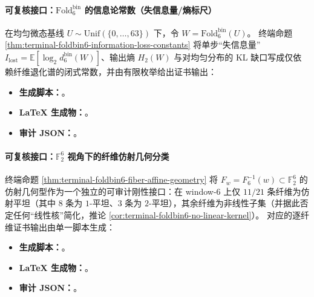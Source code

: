 \paragraph{可复核接口：\texorpdfstring{$\mathrm{Fold}^{\mathrm{bin}}_6$}{Foldbin6} 的信息论常数（失信息量/熵标尺）}
在均匀微态基线 \(U\sim\mathrm{Unif}(\{0,\dots,63\})\) 下，令 \(W=\mathrm{Fold}^{\mathrm{bin}}_6(U)\)。
终端命题 \ref{thm:terminal-foldbin6-information-loss-constants} 将单步“失信息量” \(I_{\mathrm{lost}}=\mathbb{E}[\log_2 d^{\mathrm{bin}}_6(W)]\)、输出熵 \(H_2(W)\) 与对均匀分布的 KL 缺口写成仅依赖纤维退化谱的闭式常数，并由有限枚举给出证书输出：
\begin{itemize}
  \item \textbf{生成脚本：}\texttt{}。
  \item \textbf{LaTeX 生成物：}\texttt{}。
  \item \textbf{审计 JSON：}\texttt{}。
\end{itemize}

\paragraph{可复核接口：\texorpdfstring{$\mathbb{F}_2^6$}{F2^6} 视角下的纤维仿射几何分类}
终端命题 \ref{thm:terminal-foldbin6-fiber-affine-geometry} 将 \(F_w=F_6^{-1}(w)\subset\mathbb{F}_2^6\) 的仿射几何型作为一个独立的可审计刚性接口：在 window-\(6\) 上仅 \(11/21\) 条纤维为仿射平坦（其中 \(8\) 条为 \(1\)-平坦、\(3\) 条为 \(2\)-平坦），其余纤维为非线性子集（并据此否定任何“线性核”简化，推论 \ref{cor:terminal-foldbin6-no-linear-kernel}）。
对应的逐纤维证书输出由单一脚本生成：
\begin{itemize}
  \item \textbf{生成脚本：}\texttt{}。
  \item \textbf{LaTeX 生成物：}\texttt{}。
  \item \textbf{审计 JSON：}\texttt{}。
\end{itemize}

